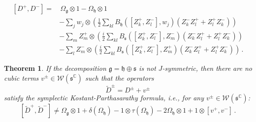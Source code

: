 \documentclass[10pt,a4paper]{amsart}
\newtheorem{theorem}{Theorem}
\newcommand{\mg}{\mathfrak{g}}
\newcommand{\mh}{\mathfrak{h}}
\newcommand{\ms}{\mathfrak{s}}
\newcommand{\weyl}{\mathcal{W}(\ms^\mathbb{C})}
\begin{document}
\begin{equation} 
\label{partha-sum}
\begin{split}
[D^+,D^-]= &\,\Omega_{\mg}
\otimes 1 - \Omega_\mh \otimes 1 \\ &
-\sum_j w_j \otimes 
\left( \frac12\sum_{kl}B_\mh([Z_k^+,Z_l^-],w_j)
(Z_k^-Z_l^++Z_l^+Z_k^-)\right) \\ &
-\sum_{m}
Z_m^+\otimes \left(\frac{i}2 \sum_{kl} 
B_\ms([Z_k^+,Z_l^-],Z_m^-)
(Z_k^-Z_l^+ + Z_l^+Z_k^-) \right) \\ &
-\sum_l 
Z_m^-\otimes \left( \frac{i}2\sum_{kl}
B_\ms([Z_k^+,Z_l^-],Z_m^+)
(Z_k^-Z_l^+ + Z_l^+Z_k^-) \right)\,.
\end{split}
\end{equation}

\begin{theorem}\label{rigidity}
If the decomposition $\mg= \mh \oplus \ms$ is not $J$-symmetric, then there are no cubic terms $v^\pm \in \weyl$ such that
the operators 
$$\tilde{D}^\pm = D^\pm + v^\pm$$ satisfy the symplectic Kostant-Parthasarathy formula, i.e., for any $v^\pm \in \mathcal{W}(\mathfrak{s}^\mathbb{C})$:
$$
[\tilde{D}^+,\tilde{D}^-] \neq 
\Omega_{\mg}\otimes 1 + \delta(\Omega_{\mh})-1\otimes \tau(\Omega_{\mh})- 2\Omega_\mh \otimes 1+ 1\otimes [v^+,v^-]\,.
$$
\end{theorem}
\end{document}
